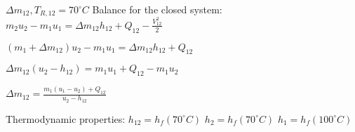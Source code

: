 \( \Delta m_{12}, T_{R,12} = 70^\circ C \)  
Balance for the closed system:  
\( m_2 u_2 - m_1 u_1 = \Delta m_{12} h_{12} + Q_{12} - \frac{V_{12}^2}{2} \)  

\( (m_1 + \Delta m_{12}) u_2 - m_1 u_1 = \Delta m_{12} h_{12} + Q_{12} \)  

\( \Delta m_{12} (u_2 - h_{12}) = m_1 u_1 + Q_{12} - m_1 u_2 \)  

\( \Delta m_{12} = \frac{m_1 (u_1 - u_2) + Q_{12}}{u_2 - h_{12}} \)  

Thermodynamic properties:  
\( h_{12} = h_f (70^\circ C) \)  
\( h_2 = h_f (70^\circ C) \)  
\( h_1 = h_f (100^\circ C) \)